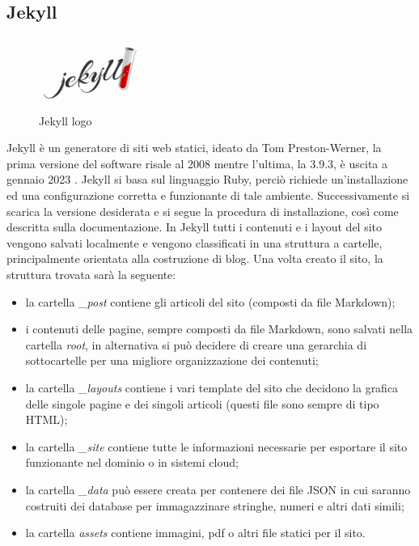 \documentclass[target=bach,aauheader=]{thud}
\begin{document}
\subsection{Jekyll}
\begin{figure}
    \centering
    \includegraphics[width = 0.3\textwidth]{images/jekyll_teaser.png}
    \caption{Jekyll logo}
\end{figure}

Jekyll è un generatore di siti web statici, ideato da Tom Preston-Werner, la prima versione del software risale al 2008 mentre l'ultima, la 3.9.3, è uscita a gennaio 2023 \cite{jekyll-site}.
Jekyll si basa sul linguaggio Ruby, perciò richiede un'installazione ed una configurazione corretta e funzionante di tale ambiente.
Successivamente si scarica la versione desiderata e si segue la procedura di installazione, così come descritta sulla documentazione.
In Jekyll tutti i contenuti e i layout del sito vengono salvati localmente e vengono classificati in una struttura a cartelle, principalmente orientata alla costruzione di blog. \newline
Una volta creato il sito, la struttura trovata sarà la seguente:
\begin{itemize}
    \item la cartella \textit{\_post} contiene gli articoli del sito (composti da file Markdown);
    \item i contenuti delle pagine, sempre composti da file Markdown, sono salvati nella cartella \textit{root}, in alternativa si può decidere di creare una gerarchia di sottocartelle per una migliore organizzazione dei contenuti;
    \item la cartella \textit{\_layouts} contiene i vari template del sito che decidono la grafica delle singole pagine e dei singoli articoli (questi file sono sempre di tipo HTML);
    \item la cartella \textit{\_site} contiene tutte le informazioni necessarie per esportare il sito funzionante nel dominio o in sistemi cloud;
    \item la cartella \textit{\_data} può essere creata per contenere dei file JSON in cui saranno costruiti dei database per immagazzinare stringhe, numeri e altri dati simili;
    \item la cartella \textit{assets} contiene immagini, pdf o altri file statici per il sito.
\end{itemize}
\end{document}
